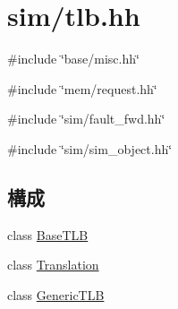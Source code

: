 \hypertarget{sim_2tlb_8hh}{
\section{sim/tlb.hh}
\label{sim_2tlb_8hh}
}
{\ttfamily \#include \char`\"{}base/misc.hh\char`\"{}}\par
{\ttfamily \#include \char`\"{}mem/request.hh\char`\"{}}\par
{\ttfamily \#include \char`\"{}sim/fault\_\-fwd.hh\char`\"{}}\par
{\ttfamily \#include \char`\"{}sim/sim\_\-object.hh\char`\"{}}\par
\subsection*{構成}
\begin{DoxyCompactItemize}
\item 
class \hyperlink{classBaseTLB}{BaseTLB}
\item 
class \hyperlink{classBaseTLB_1_1Translation}{Translation}
\item 
class \hyperlink{classGenericTLB}{GenericTLB}
\end{DoxyCompactItemize}
